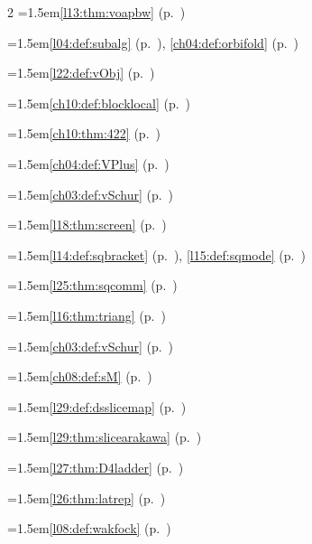 \begin{multicols}{2}
\hangindent=1.5em\quad \ref{l13:thm:voapbw} (p.~\pageref{l13:thm:voapbw})\par
\hangindent=1.5em\quad \ref{l04:def:subalg} (p.~\pageref{l04:def:subalg}), \ref{ch04:def:orbifold} (p.~\pageref{ch04:def:orbifold})\par
\hangindent=1.5em\quad \ref{l22:def:vObj} (p.~\pageref{l22:def:vObj})\par
\hangindent=1.5em\quad \ref{ch10:def:blocklocal} (p.~\pageref{ch10:def:blocklocal})\par
\hangindent=1.5em\quad \ref{ch10:thm:422} (p.~\pageref{ch10:thm:422})\par
\hangindent=1.5em\quad \ref{ch04:def:VPlus} (p.~\pageref{ch04:def:VPlus})\par
\hangindent=1.5em\quad \ref{ch03:def:vSchur} (p.~\pageref{ch03:def:vSchur})\par
\hangindent=1.5em\quad \ref{l18:thm:screen} (p.~\pageref{l18:thm:screen})\par
\hangindent=1.5em\quad \ref{l14:def:sqbracket} (p.~\pageref{l14:def:sqbracket}), \ref{l15:def:sqmode} (p.~\pageref{l15:def:sqmode})\par
\hangindent=1.5em\quad \ref{l25:thm:sqcomm} (p.~\pageref{l25:thm:sqcomm})\par
\hangindent=1.5em\quad \ref{l16:thm:triang} (p.~\pageref{l16:thm:triang})\par
\hangindent=1.5em\quad \ref{ch03:def:vSchur} (p.~\pageref{ch03:def:vSchur})\par
\hangindent=1.5em\quad \ref{ch08:def:sM} (p.~\pageref{ch08:def:sM})\par
\par{}\par\nopagebreak\smallskip
\hangindent=1.5em\quad \ref{l29:def:dsslicemap} (p.~\pageref{l29:def:dsslicemap})\par
\hangindent=1.5em\quad \ref{l29:thm:slicearakawa} (p.~\pageref{l29:thm:slicearakawa})\par
\hangindent=1.5em\quad \ref{l27:thm:D4ladder} (p.~\pageref{l27:thm:D4ladder})\par
\hangindent=1.5em\quad \ref{l26:thm:latrep} (p.~\pageref{l26:thm:latrep})\par
\hangindent=1.5em\quad \ref{l08:def:wakfock} (p.~\pageref{l08:def:wakfock})\par

\end{multicols}
